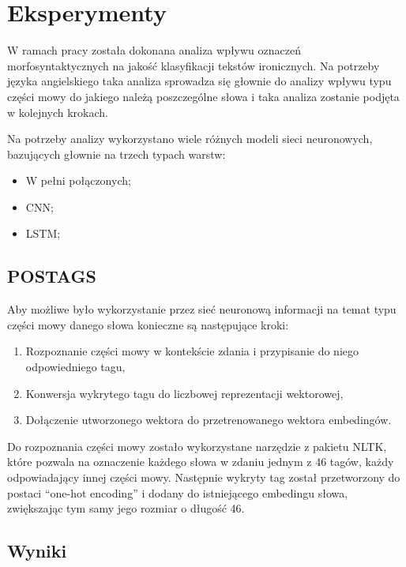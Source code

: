 \newpage %
\section{Eksperymenty}
   
W ramach pracy została dokonana analiza wpływu oznaczeń morfosyntaktycznych na jakość klasyfikacji tekstów ironicznych. Na potrzeby języka angielskiego taka analiza sprowadza się głownie do analizy wpływu typu części mowy do jakiego należą poszczególne słowa i taka analiza zostanie podjęta w kolejnych krokach. 

Na potrzeby analizy wykorzystano wiele różnych modeli sieci neuronowych, bazujących głownie na trzech typach warstw: 

\begin{itemize}
    \item W pełni połączonych;
    \item CNN;
    \item LSTM;
\end{itemize}


\subsection{POSTAGS}

Aby możliwe było wykorzystanie przez sieć neuronową informacji na temat typu części mowy danego słowa konieczne są następujące kroki: 

\begin{enumerate}
    \item Rozpoznanie części mowy w kontekście zdania i przypisanie do niego odpowiedniego tagu,
    \item Konwersja wykrytego tagu do liczbowej reprezentacji wektorowej,
    \item Dołączenie utworzonego wektora do przetrenowanego wektora embedingów.  
\end{enumerate}

\hfill \break %
Do rozpoznania części mowy zostało wykorzystane narzędzie z pakietu NLTK, które pozwala na oznaczenie każdego słowa w zdaniu jednym z 46 tagów, każdy odpowiadający innej części mowy. Następnie wykryty tag został przetworzony do postaci “one-hot encoding” i dodany do istniejącego embedingu słowa, zwiększając tym samy jego rozmiar o długość 46. 


\subsection{Wyniki}

